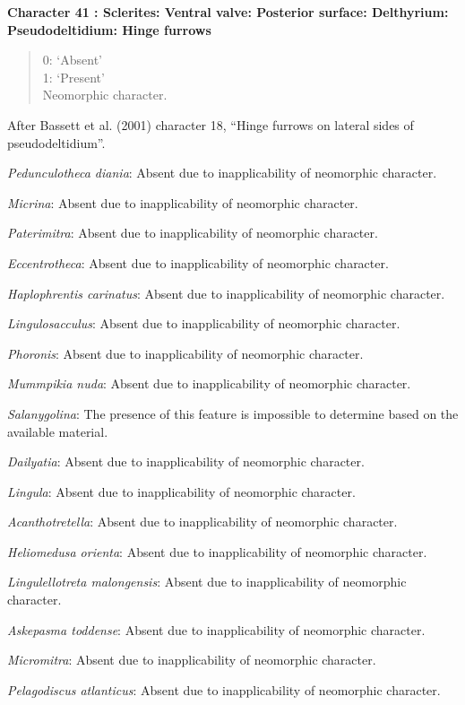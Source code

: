 \documentclass[]{book}
\theoremstyle{definition}
\theoremstyle{definition}
\theoremstyle{definition}
\theoremstyle{remark}
\begin{document}
\textbf{Character 41 : Sclerites: Ventral valve: Posterior surface:
Delthyrium: Pseudodeltidium: Hinge furrows }

\begin{quote}
0: `Absent'\\
1: `Present'\\
Neomorphic character.
\end{quote}

After Bassett et al. (2001) character 18, ``Hinge furrows on lateral
sides of pseudodeltidium''.

\emph{Pedunculotheca diania}: Absent due to inapplicability of
neomorphic character.

\emph{Micrina}: Absent due to inapplicability of neomorphic character.

\emph{Paterimitra}: Absent due to inapplicability of neomorphic
character.

\emph{Eccentrotheca}: Absent due to inapplicability of neomorphic
character.

\emph{Haplophrentis carinatus}: Absent due to inapplicability of
neomorphic character.

\emph{Lingulosacculus}: Absent due to inapplicability of neomorphic
character.

\emph{Phoronis}: Absent due to inapplicability of neomorphic character.

\emph{Mummpikia nuda}: Absent due to inapplicability of neomorphic
character.

\emph{Salanygolina}: The presence of this feature is impossible to
determine based on the available material.

\emph{Dailyatia}: Absent due to inapplicability of neomorphic character.

\emph{Lingula}: Absent due to inapplicability of neomorphic character.

\emph{Acanthotretella}: Absent due to inapplicability of neomorphic
character.

\emph{Heliomedusa orienta}: Absent due to inapplicability of neomorphic
character.

\emph{Lingulellotreta malongensis}: Absent due to inapplicability of
neomorphic character.

\emph{Askepasma toddense}: Absent due to inapplicability of neomorphic
character.

\emph{Micromitra}: Absent due to inapplicability of neomorphic
character.

\emph{Pelagodiscus atlanticus}: Absent due to inapplicability of
neomorphic character.
\end{document}
